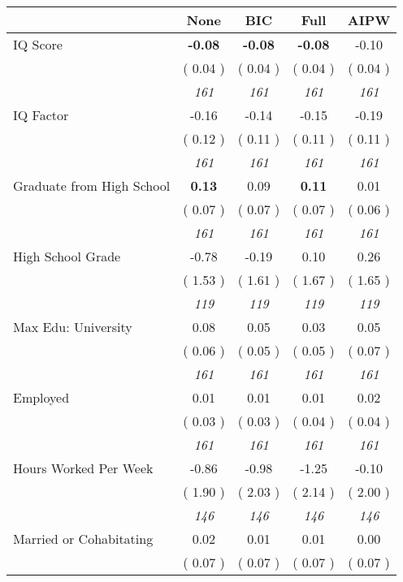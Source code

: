\begin{tabular}{l c c c c}
\toprule
 & None & BIC & Full & AIPW \\
\midrule
IQ Score & \textbf{     -0.08 } & \textbf{     -0.08 } & \textbf{     -0.08 } &     -0.10 \\
& (     0.04 ) & (     0.04 ) & (     0.04 ) & (     0.04 ) \\
& \textit{ 161 } & \textit{ 161 } & \textit{ 161 } & \textit{ 161 } \\
IQ Factor &     -0.16 &     -0.14 &     -0.15 &     -0.19 \\
& (     0.12 ) & (     0.11 ) & (     0.11 ) & (     0.11 ) \\
& \textit{ 161 } & \textit{ 161 } & \textit{ 161 } & \textit{ 161 } \\
Graduate from High School & \textbf{      0.13 } &      0.09 & \textbf{      0.11 } &      0.01 \\
& (     0.07 ) & (     0.07 ) & (     0.07 ) & (     0.06 ) \\
& \textit{ 161 } & \textit{ 161 } & \textit{ 161 } & \textit{ 161 } \\
High School Grade &     -0.78 &     -0.19 &      0.10 &      0.26 \\
& (     1.53 ) & (     1.61 ) & (     1.67 ) & (     1.65 ) \\
& \textit{ 119 } & \textit{ 119 } & \textit{ 119 } & \textit{ 119 } \\
Max Edu: University &      0.08 &      0.05 &      0.03 &      0.05 \\
& (     0.06 ) & (     0.05 ) & (     0.05 ) & (     0.07 ) \\
& \textit{ 161 } & \textit{ 161 } & \textit{ 161 } & \textit{ 161 } \\
Employed &      0.01 &      0.01 &      0.01 &      0.02 \\
& (     0.03 ) & (     0.03 ) & (     0.04 ) & (     0.04 ) \\
& \textit{ 161 } & \textit{ 161 } & \textit{ 161 } & \textit{ 161 } \\
Hours Worked Per Week &     -0.86 &     -0.98 &     -1.25 &     -0.10 \\
& (     1.90 ) & (     2.03 ) & (     2.14 ) & (     2.00 ) \\
& \textit{ 146 } & \textit{ 146 } & \textit{ 146 } & \textit{ 146 } \\
Married or Cohabitating &      0.02 &      0.01 &      0.01 &      0.00 \\
& (     0.07 ) & (     0.07 ) & (     0.07 ) & (     0.07 ) \\

\end{tabular}
